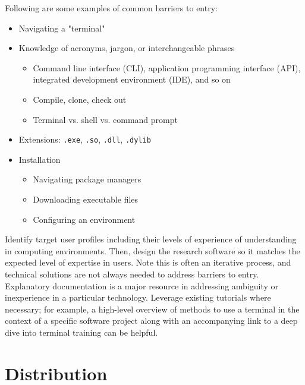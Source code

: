 \documentclass[]{nrel}
\begin{document}
Following are some examples of common barriers to entry:
\begin{itemize}
\item Navigating a "terminal"

\item Knowledge of acronyms, jargon, or interchangeable phrases
\begin{itemize}
\item Command line interface (CLI), application programming interface (API), integrated development environment (IDE), and so on

\item Compile, clone, check out

\item Terminal vs. shell vs. command prompt

\end{itemize}

\item Extensions: \lstinline{.exe}, \lstinline{.so}, \lstinline{.dll}, \lstinline{.dylib}

\item Installation
\begin{itemize}
\item Navigating package managers

\item Downloading executable files

\item Configuring an environment

\end{itemize}

\end{itemize}

Identify target user profiles including their levels of experience of understanding in
computing environments.
Then, design the research software so it matches the expected level of expertise in
users.
Note this is often an iterative process, and technical solutions are not always needed
to address barriers to entry.
Explanatory documentation is a major resource in addressing ambiguity or inexperience in
a particular technology.
Leverage existing tutorials where necessary; for example, a high-level overview of methods
to use a terminal in the context of a specific software project along with an accompanying
link to a deep dive into terminal training can be helpful.

\section{Distribution}
\end{document}
